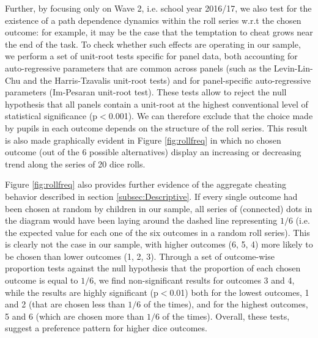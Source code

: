\documentclass[authoryear, preprint, review, 12pt]{elsarticle}
\begin{document}
Further, by focusing only on Wave 2, i.e. school year 2016/17, we also test for the existence of a path dependence dynamics within the roll series w.r.t the chosen outcome: for example, it may be the case that the temptation to cheat grows near the end of the task. To check whether such effects are operating in our sample, we perform a set of unit-root tests specific for panel data, both accounting for auto-regressive parameters that are common across panels (such as the Levin-Lin-Chu and the Harris-Tzavalis unit-root tests) and for panel-specific auto-regressive parameters (Im-Pesaran unit-root test). These tests allow to reject the null hypothesis that all panels contain a unit-root at the highest conventional level of statistical significance (p$<$0.001). We can therefore exclude that the choice made by pupils in each outcome depends on the structure of the roll series. This result is also made graphically evident in Figure \ref{fig:rollfreq} in which no chosen outcome (out of the 6 possible alternatives) display an increasing or decreasing trend along the series of 20 dice rolls.  

Figure \ref{fig:rollfreq} also provides further evidence of the aggregate cheating behavior described in section \ref{subsec:Descriptive}. If every single outcome had been chosen at random by children in our sample, all series of (connected) dots in the diagram would have been laying around the dashed line representing $1/6$ (i.e. the expected value for each one of the six outcomes in a random roll series). This is clearly not the case in our sample, with higher outcomes (6, 5, 4) more likely to be chosen than lower outcomes (1, 2, 3). Through a set of outcome-wise proportion tests against the null hypothesis that the proportion of each chosen outcome is equal to $1/6$, we find non-significant results for outcomes 3 and 4, while the results are highly significant (p$<$0.01) both for the lowest outcomes, 1 and 2 (that are chosen less than $1/6$ of the times), and for the highest outcomes, 5 and 6 (which are chosen  more than $1/6$ of the times). Overall, these tests, suggest a preference pattern for higher dice outcomes.
\end{document}
